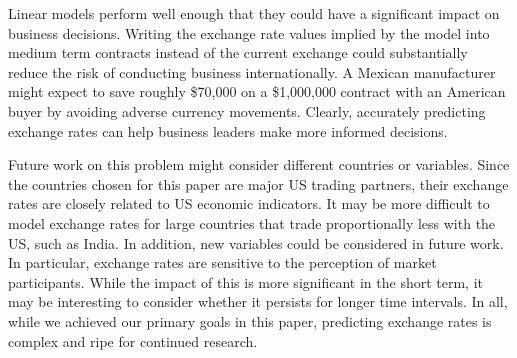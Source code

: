 \documentclass{sig-alternate-05-2015}
\begin{document}
Linear models perform well enough that they could have a significant impact on business decisions. Writing the exchange rate values implied by the model into medium term contracts instead of the current exchange could substantially reduce the risk of conducting business internationally. A Mexican manufacturer might expect to save roughly \$70,000 on a \$1,000,000 contract with an American buyer by avoiding adverse currency movements. Clearly, accurately predicting exchange rates can help business leaders make more informed decisions.

Future work on this problem might consider different countries or variables. Since the countries chosen for this paper are major US trading partners, their exchange rates are closely related to US economic indicators. It may be more difficult to model exchange rates for large countries that trade proportionally less with the US, such as India. In addition, new variables could be considered in future work. In particular, exchange rates are sensitive to the perception of market participants. While the impact of this is more significant in the short term, it may be interesting to consider whether it persists for longer time intervals. In all, while we achieved our primary goals in this paper, predicting exchange rates is complex and ripe for continued research.  


     
\newenvironment{hangref}{\begin{list}{}{\setlength{\itemsep}{0pt}
\setlength{\parsep}{0pt}\setlength{\rightmargin}{0pt}
\setlength{\leftmargin}{+\parindent}
\setlength{\itemindent}{-\parindent}}}{\end{list}}
\end{document}
